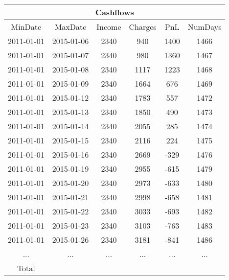 \begin{longtable}{|c|c|c|c|c|c|}
\hline
\multicolumn{6}{|c|}{Cashflows} \\
\hline
MinDate & MaxDate & Income & Charges & PnL & NumDays\\
\hline
2011-01-01 & 2015-01-06 & 2340 & 940 & 1400 & 1466\\
\hline
2011-01-01 & 2015-01-07 & 2340 & 980 & 1360 & 1467\\
\hline
2011-01-01 & 2015-01-08 & 2340 & 1117 & 1223 & 1468\\
\hline
2011-01-01 & 2015-01-09 & 2340 & 1664 & 676 & 1469\\
\hline
2011-01-01 & 2015-01-12 & 2340 & 1783 & 557 & 1472\\
\hline
2011-01-01 & 2015-01-13 & 2340 & 1850 & 490 & 1473\\
\hline
2011-01-01 & 2015-01-14 & 2340 & 2055 & 285 & 1474\\
\hline
2011-01-01 & 2015-01-15 & 2340 & 2116 & 224 & 1475\\
\hline
2011-01-01 & 2015-01-16 & 2340 & 2669 & -329 & 1476\\
\hline
2011-01-01 & 2015-01-19 & 2340 & 2955 & -615 & 1479\\
\hline
2011-01-01 & 2015-01-20 & 2340 & 2973 & -633 & 1480\\
\hline
2011-01-01 & 2015-01-21 & 2340 & 2998 & -658 & 1481\\
\hline
2011-01-01 & 2015-01-22 & 2340 & 3033 & -693 & 1482\\
\hline
2011-01-01 & 2015-01-23 & 2340 & 3103 & -763 & 1483\\
\hline
2011-01-01 & 2015-01-26 & 2340 & 3181 & -841 & 1486\\
\hline
 ... & ... & ... & ... & ... & ...\\
\hline
 Total &  &  &  &  & \\
\hline
\end{longtable}
